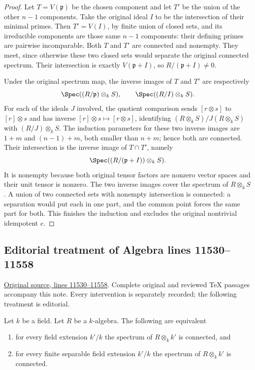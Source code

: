\begin{proof}
Let $T=V(\mathfrak p)$ be the
chosen component and let $T'$
be the union of the other
$n-1$ components. Take the
original ideal $I$ to be the
intersection of their minimal
primes. Then $T'=V(I)$, by
finite union of closed sets,
and its irreducible components
are those same $n-1$ components:
their defining primes are
pairwise incomparable. Both
$T$ and $T'$ are connected
and nonempty. They meet,
since otherwise these two
closed sets would separate
the original connected spectrum.
Their intersection is exactly
$V(\mathfrak p+I)$, so
$R/(\mathfrak p+I)\neq0$.

Under the original spectrum map,
the inverse images of $T$ and
$T'$ are respectively
$$
\Spec((R/\mathfrak p)\otimes_k S),\qquad
\Spec((R/I)\otimes_k S).
$$
For each of the ideals $J$
involved, the quotient comparison
sends $[r\otimes s]$ to
$[r]\otimes s$ and has inverse
$[r]\otimes s\mapsto[r\otimes s]$,
identifying $(R\otimes_k S)/J(R\otimes_k S)$
with $(R/J)\otimes_k S$.
The induction parameters for
these two inverse images are
$1+m$ and $(n-1)+m$, both
smaller than $n+m$; hence
both are connected. Their
intersection is the inverse
image of $T\cap T'$, namely
$$
\Spec((R/(\mathfrak p+I))\otimes_k S).
$$
It is nonempty because both
original tensor factors are
nonzero vector spaces and
their unit tensor is nonzero.
The two inverse images cover
the spectrum of $R\otimes_k S$.
A union of two connected sets
with nonempty intersection is
connected: a separation would
put each in one part, and
the common point forces the
same part for both.
This finishes the induction
and excludes the original
nontrivial idempotent $e$.
\end{proof}


\subsection{Editorial treatment of Algebra lines 11530--11558}

\hypertarget{algebra-context-150}{}

\noindent\href{https://github.com/stacks/stacks-project/blob/a04446e57ec1fbc252a871afcec7752fb2807b14/algebra.tex\#L11530}{Original source, lines 11530--11558}. Complete original and reviewed TeX passages accompany this note. Every intervention is separately recorded; the following treatment is editorial.


\begin{lemma}
\label{editorial-source-lemma-geometrically-connected}
Let $k$ be a field.
Let $R$ be a $k$-algebra.
The following are equivalent
\begin{enumerate}
\item for every field extension $k'/k$ the
spectrum of $R \otimes_k k'$ is connected, and
\item for every finite separable field extension $k'/k$ the
spectrum of $R \otimes_k k'$ is connected.
\end{enumerate}
\end{lemma}

